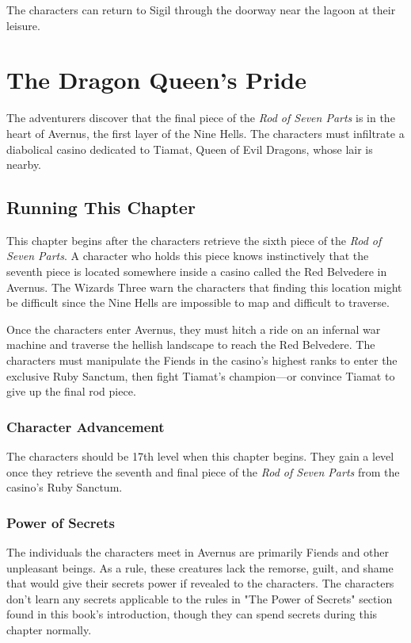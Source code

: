 \documentclass[10pt,a4paper,twoside,bg=print,twocolumn,openany,nodeprecatedcode]{dndbook}
\begin{document}
The characters can return to Sigil through the doorway near the lagoon at their leisure.

\chapter{The Dragon Queen's Pride}
The adventurers discover that the final piece of the \textit{Rod of Seven Parts} is in the heart of Avernus, the first layer of the Nine Hells. The characters must infiltrate a diabolical casino dedicated to Tiamat, Queen of Evil Dragons, whose lair is nearby.

\section{Running This Chapter}
This chapter begins after the characters retrieve the sixth piece of the \textit{Rod of Seven Parts}. A character who holds this piece knows instinctively that the seventh piece is located somewhere inside a casino called the Red Belvedere in Avernus. The Wizards Three warn the characters that finding this location might be difficult since the Nine Hells are impossible to map and difficult to traverse.

Once the characters enter Avernus, they must hitch a ride on an infernal war machine and traverse the hellish landscape to reach the Red Belvedere. The characters must manipulate the Fiends in the casino's highest ranks to enter the exclusive Ruby Sanctum, then fight Tiamat's champion—or convince Tiamat to give up the final rod piece.

\subsection{Character Advancement}
The characters should be 17th level when this chapter begins. They gain a level once they retrieve the seventh and final piece of the \textit{Rod of Seven Parts} from the casino's Ruby Sanctum.

\subsection{Power of Secrets}
The individuals the characters meet in Avernus are primarily Fiends and other unpleasant beings. As a rule, these creatures lack the remorse, guilt, and shame that would give their secrets power if revealed to the characters. The characters don't learn any secrets applicable to the rules in "The Power of Secrets" section found in this book's introduction, though they can spend secrets during this chapter normally.
\end{document}
